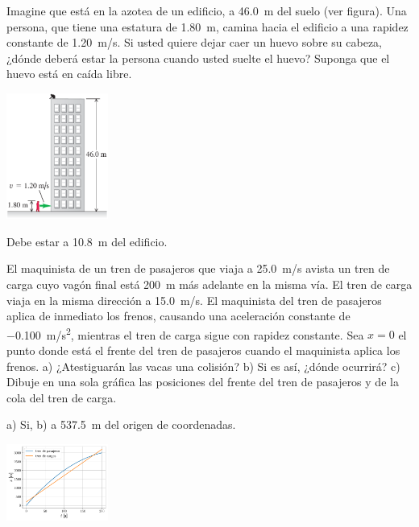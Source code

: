 \documentclass[11pt]{article}
\begin{document}
\begin{exercise}
\begin{multicols}{2}
        Imagine que está en la azotea de un edificio, a \qty{46.0}{m} del suelo (ver figura). Una persona, que tiene una estatura de \qty{1.80}{m}, camina hacia el edificio a una rapidez constante de \qty{1.20}{m/s}. Si usted quiere dejar caer un huevo sobre su cabeza, ¿dónde deberá estar la persona cuando usted suelte el huevo? Suponga que el huevo está en caída libre.
\begin{center}
    \includegraphics[width=0.25\textwidth]{figs/activ-13.png}
\end{center}
\end{multicols}
\end{exercise}
\begin{solution}
    Debe estar a \qty{10.8}{m} del edificio.
\end{solution}

\begin{exercise}
    El maquinista de un tren de pasajeros que viaja a \qty{25.0}{m/s} avista un tren de carga cuyo  vagón final está \qty{200}{m} más adelante en la misma vía. El tren de carga viaja en la misma dirección a \qty{15.0}{m/s}. El maquinista del tren de pasajeros aplica de inmediato los frenos, causando una aceleración constante de \qty{-0.100}{m/s^2}, mientras el tren de carga sigue con rapidez constante. Sea $x = 0$ el punto donde está el frente del tren de pasajeros cuando el maquinista aplica los frenos. a) ¿Atestiguarán las vacas una colisión? b) Si es así, ¿dónde ocurrirá? c) Dibuje en una sola gráfica las posiciones del frente del tren de pasajeros y de la cola del tren de carga.
\end{exercise}
\begin{solution}
    \begin{multicols}{2}
    a) Si, b) a \qty{537.5}{m} del origen de coordenadas.
\begin{center}
    \includegraphics[width=0.25\textwidth]{figs/ac-13.pdf}
\end{center}
\end{multicols}
\end{solution}
\end{document}
